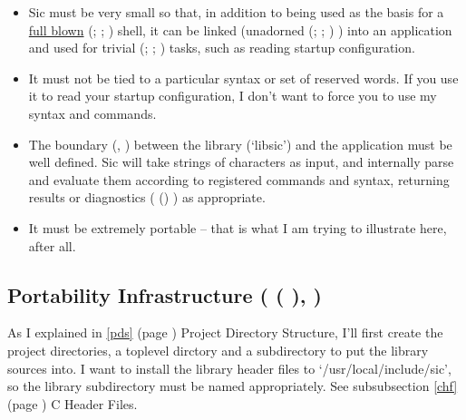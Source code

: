 \begin{itemize}
\item Sic must be very small so that, in addition to being used as the 
basis for a \underline{full blown} ({\MaQ{}}; {\MaQ{}}; {\MaQ{}})
shell, it can be linked (unadorned ({\MbQ{}}; {\MaQ{}}; {\MgQ{}}) ) into an 
application and used for trivial ({\MmQ{}}; {\MaQ{}}; {\MbQ{}}) tasks,
such as reading startup configuration. 

\item It must not be tied to a particular syntax or set of reserved words.
If you use it to read your startup configuration, I don't want to force 
you to use my syntax and commands. 

\item The boundary ({\MjQ{}}, {\MaQ{}}) between the library (`libsic') and the 
application must be well defined. Sic will take strings of characters as input,
and internally parse and evaluate them according to registered commands and 
syntax, returning results or diagnostics ( ({\MbQ{}}) {\MiQ{}}) as appropriate. 

\item It must be extremely portable -- that is what I am trying to 
illustrate here, after all. 
\end{itemize}

\subsection[Portability Infrastructure]{Portability Infrastructure
({\MaQ{}} ({\MaQ{}} {\MaQ{}} {\MaQ{}}), {\MeQ{}})}

As I explained in \ref{pds} (page \pageref{pds}) Project Directory Structure,
I'll first create the 
project directories, a toplevel dirctory and a subdirectory to put the library 
sources into. I want to install the library header files 
to `/usr/local/include/sic', so the library subdirectory must be named 
appropriately. See subsubsection \ref{chf} (page \pageref{chf}) C Header Files. 


